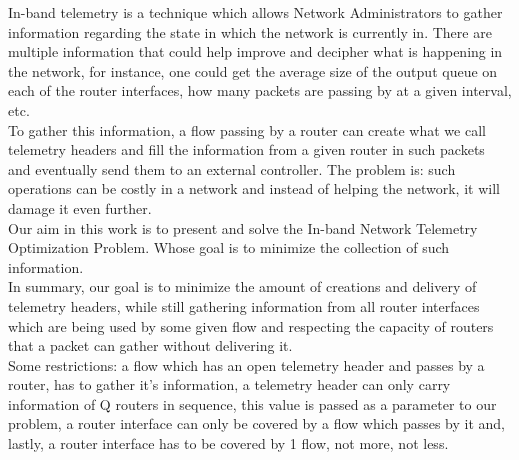 In-band telemetry is a technique which allows Network Administrators to gather information regarding the state in which the network is currently in. There are multiple information that could help improve and decipher what is happening in the network, for instance, one could get the average size of the output queue on each of the router interfaces, how many packets are passing by at a given interval, etc. \\

To gather this information, a flow passing by a router can create what we call telemetry headers and fill the information from a given router in such packets and eventually send them to an external controller. The problem is: such operations can be costly in a network and instead of helping the network, it will damage it even further. \\

Our aim in this work is to present and solve the In-band Network Telemetry Optimization Problem. Whose goal is to minimize the collection of such information. \\

In summary, our goal is to minimize the amount of creations and delivery of telemetry headers, while still gathering information from all router interfaces which are being used by some given flow and respecting the capacity of routers that a packet can gather without delivering it. \\

Some restrictions: a flow which has an open telemetry header and passes by a router, has to gather it's information, a telemetry header can only carry information of Q routers in sequence, this value is passed as a parameter to our problem, a router interface can only be covered by a flow which passes by it and, lastly, a router interface has to be covered by 1 flow, not more, not less. \\